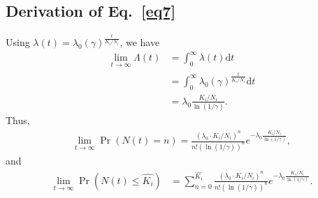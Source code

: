 \documentclass[format=acmsmall, review=true, screen=true, anonymous=true]{acmart}
\begin{document}
\subsection{Derivation of Eq.~\eqref{eq7}}
Using $\lambda (t) = \lambda_0 {(\gamma)}^{\frac{t}{K_i/N_i}}$, we have
\begin{align*}
\lim_{t \rightarrow \infty} \Lambda (t) &=\int _{0}^{\infty}\lambda (t)\mathrm{d}t\\
&= \int _{0}^{\infty} \lambda_0 {(\gamma)}^{\frac{t}{K_i/N_i}} \mathrm{d}t\\
&= \lambda_0 \frac{K_i/N_i}{\ln{(1/\gamma)}}.
\end{align*}
Thus,
\begin{align*}
\lim_{t\rightarrow \infty}\Pr\left(N(t) = n\right) = \frac{(\lambda_0 \cdot K_i/N_i)^n}{n!(\ln{(1/\gamma)})^n}e^{-\lambda_0 \frac{K_i/N_i}{\ln{(1/\gamma)}}},
\end{align*}
and
\begin{align*}
\lim_{t\rightarrow \infty}\Pr\left(N(t)\leq \hat{K_i}\right) & = \sum_{n=0}^{\hat{K_i}} \frac{(\lambda_0 \cdot K_i/N_i)^n}{n!(\ln{(1/\gamma)})^n}e^{-\lambda_0 \frac{K_i/N_i}{\ln{(1/\gamma)}}}.
\end{align*}




\end{document}
